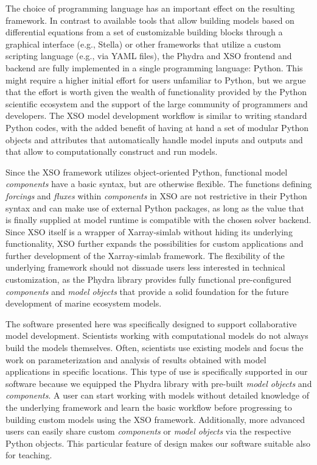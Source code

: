 \documentclass[journal abbreviation, manuscript]{copernicus}
\begin{document}
The choice of programming language has an important effect on the resulting framework. In contrast to available tools that allow building models based on differential equations from a set of customizable building blocks through a graphical interface (e.g., Stella) or other frameworks that utilize a custom scripting language (e.g., via YAML files), the Phydra and XSO frontend and backend are fully implemented in a single programming language: Python. This might require a higher initial effort for users unfamiliar to Python, but we argue that the effort is worth given the wealth of functionality provided by the Python scientific ecosystem and the support of the large community of programmers and developers. The XSO model development workflow is similar to writing standard Python codes, with the added benefit of having at hand a set of modular Python objects and attributes that automatically handle model inputs and outputs and that allow to computationally construct and run models. 

Since the XSO framework utilizes object-oriented Python, functional model \textit{components} have a basic syntax, but are otherwise flexible. The functions defining \textit{forcings} and \textit{fluxes} within \textit{components} in XSO are not restrictive in their Python syntax and can make use of external Python packages, as long as the value that is finally supplied at model runtime is compatible with the chosen solver backend. Since XSO itself is a wrapper of Xarray-simlab without hiding its underlying functionality, XSO further expands the possibilities for custom applications and further development of the Xarray-simlab framework. The flexibility of the underlying framework should not dissuade users less interested in technical customization, as the Phydra library provides fully functional pre-configured \textit{components} and \textit{model objects} that provide a solid foundation for the future development of marine ecosystem models. 


The software presented here was specifically designed to support collaborative model development. Scientists working with computational models do not always build the models themselves. Often, scientists use existing models and focus the work on parameterization and analysis of results obtained with model applications in specific locations. This type of use is specifically supported in our software because we equipped the Phydra library with pre-built \textit{model objects} and \textit{components}. A user can start working with models without detailed knowledge of the underlying framework and learn the basic workflow before progressing to building custom models using the XSO framework. Additionally, more advanced users can easily share custom \textit{components} or \textit{model objects} via the respective Python objects. This particular feature of design makes our software suitable also for teaching. 
\end{document}
